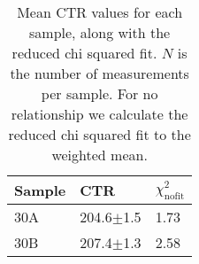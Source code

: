 \begin{table}[H]
\caption{Mean CTR values for each sample, along with the reduced chi squared fit. $N$ is the number of measurements per sample. For no relationship we calculate the reduced chi squared fit to the weighted mean.}
\label{tab:doiresults-ProteusUnwrapped}
\begin{tabular}{lll}
\toprule
Sample &            CTR &   $\chi^2_\text{nofit}$ \\
\midrule
   30A &  204.6$\pm$1.5 &  1.73 \\
   30B &  207.4$\pm$1.3 &  2.58 \\
\bottomrule
\end{tabular}
\end{table}